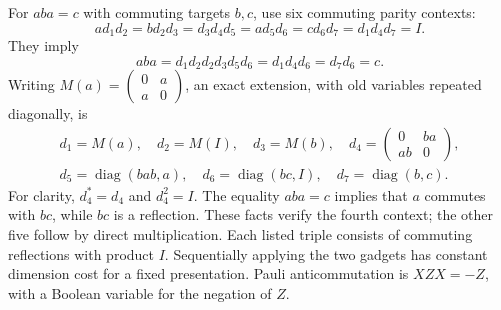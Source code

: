 For $aba=c$ with commuting targets $b,c$, use six commuting parity contexts:
\begin{equation}\label{eq:six-contexts}
 ad_1d_2=bd_2d_3=d_3d_4d_5=ad_5d_6=cd_6d_7=d_1d_4d_7=I.
\end{equation}
They imply
\[
 aba=d_1d_2d_2d_3d_5d_6=d_1d_4d_6=d_7d_6=c.
\]
Writing $M(a)=\left(\begin{smallmatrix}0&a\\a&0\end{smallmatrix}\right)$, an exact extension, with old variables repeated diagonally, is
\begin{gather*}
 d_1=M(a),\quad d_2=M(I),\quad d_3=M(b),\quad
 d_4=\begin{pmatrix}0&ba\\ab&0\end{pmatrix},\\
 d_5=\operatorname{diag}(bab,a),\quad d_6=\operatorname{diag}(bc,I),\quad
 d_7=\operatorname{diag}(b,c).
\end{gather*}
For clarity, $d_4^*=d_4$ and $d_4^2=I$. The equality $aba=c$ implies that $a$ commutes with $bc$, while $bc$ is a reflection. These facts verify the fourth context; the other five follow by direct multiplication. Each listed triple consists of commuting reflections with product $I$. Sequentially applying the two gadgets has constant dimension cost for a fixed presentation. Pauli anticommutation is $XZX=-Z$, with a Boolean variable for the negation of $Z$.

